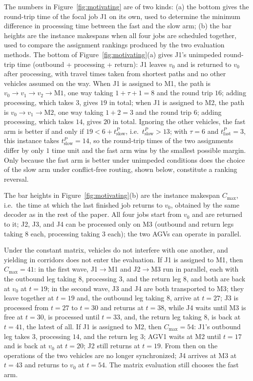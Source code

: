 \documentclass[manuscript,screen,review]{acmart}
\begin{document}
The numbers in Figure~\ref{fig:motivating} are of two kinds: (a) the bottom gives the round-trip time of the focal job J1 on its own, used to determine the minimum difference in processing time between the fast and the slow arm; (b) the bar heights are the instance makespans when all four jobs are scheduled together, used to compare the assignment rankings produced by the two evaluation methods.
The bottom of Figure~\ref{fig:motivating}(a) gives J1's unimpeded round-trip time (outbound + processing + return): J1 leaves $v_0$ and is returned to $v_0$ after processing, with travel times taken from shortest paths and no other vehicles assumed on the way.
When J1 is assigned to M1, the path is $v_0\to v_1\to v_2\to\mathrm{M1}$, one way taking $1+\tau+1=8$ and the round trip $16$; adding processing, which takes $3$, gives $19$ in total;
when J1 is assigned to M2, the path is $v_0\to v_1\to\mathrm{M2}$, one way taking $1+2=3$ and the round trip $6$; adding processing, which takes $14$, gives $20$ in total.
Ignoring the other vehicles, the fast arm is better if and only if $19<6+t^P_{\text{slow}}$, i.e.\ $t^P_{\text{slow}}>13$; with $\tau=6$ and $t^P_{\text{fast}}=3$, this instance takes $t^P_{\text{slow}}=14$, so the round-trip times of the two assignments differ by only $1$ time unit and the fast arm wins by the smallest possible margin.
Only because the fast arm is better under unimpeded conditions does the choice of the slow arm under conflict-free routing, shown below, constitute a ranking reversal.

The bar heights in Figure~\ref{fig:motivating}(b) are the instance makespan $C_{\max}$, i.e.\ the time at which the last finished job returns to $v_0$, obtained by the same decoder as in the rest of the paper.
All four jobs start from $v_0$ and are returned to it; J2, J3, and J4 can be processed only on M3 (outbound and return legs taking $8$ each, processing taking $3$ each); the two AGVs can operate in parallel.

Under the constant matrix, vehicles do not interfere with one another, and yielding in corridors does not enter the evaluation.
If J1 is assigned to M1, then $C_{\max}=41$: in the first wave, J1$\to$M1 and J2$\to$M3 run in parallel, each with the outbound leg taking $8$, processing $3$, and the return leg $8$, and both are back at $v_0$ at $t=19$;
in the second wave, J3 and J4 are both transported to M3; they leave together at $t=19$ and, the outbound leg taking $8$, arrive at $t=27$; J3 is processed from $t=27$ to $t=30$ and returns at $t=38$, while J4 waits until M3 is free at $t=30$, is processed until $t=33$, and, the return leg taking $8$, is back at $t=41$, the latest of all.
If J1 is assigned to M2, then $C_{\max}=54$: J1's outbound leg takes $3$, processing $14$, and the return leg $3$; AGV1 waits at M2 until $t=17$ and is back at $v_0$ at $t=20$; J2 still returns at $t=19$.
From then on the operations of the two vehicles are no longer synchronized; J4 arrives at M3 at $t=43$ and returns to $v_0$ at $t=54$. The matrix evaluation still chooses the fast arm.
\end{document}
